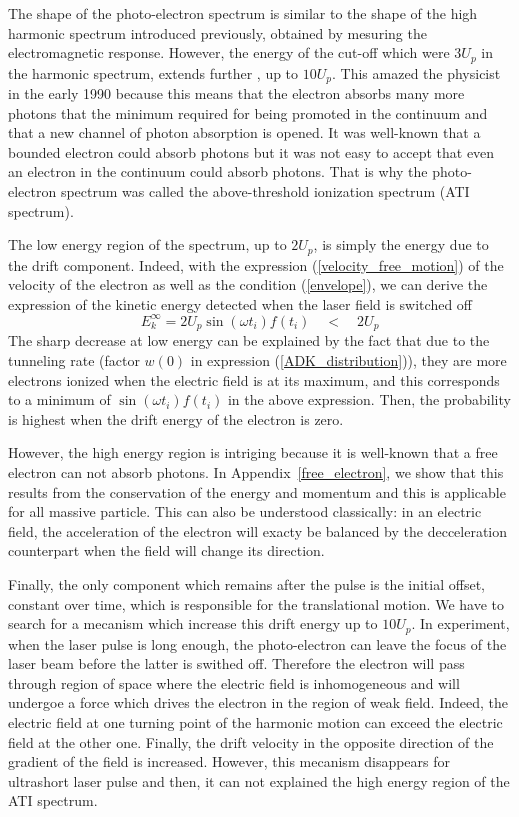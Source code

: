 \documentclass[a4paper]{article}
\begin{document}
\par
The shape of the photo-electron spectrum is similar to the shape of the high harmonic spectrum introduced previously, obtained by mesuring the electromagnetic response. However, the energy of the cut-off which were $3U_{p}$ in the harmonic spectrum, extends further \cite{Schafer_1993}, up to $10U_{p}$. This amazed the physicist in the early 1990 because this means that the electron absorbs many more photons that the minimum required for being promoted in the continuum and that a new channel of photon absorption is opened. It was well-known that a bounded electron could absorb photons but it was not easy to accept that even an electron in the continuum could absorb photons. That is why the photo-electron spectrum was called the above-threshold ionization spectrum (ATI spectrum).
\par
The low energy region of the spectrum, up to $2U_{p}$, is simply the energy due to the drift component. Indeed, with the expression (\ref{velocity_free_motion}) of the velocity of the electron as well as the condition (\ref{envelope}), we can derive the expression of the kinetic energy detected when the laser field is switched off
\begin{equation}
E_{k}^{\infty}=2U_{p}\sin(\omega t_{i})f(t_{i}) \quad < \quad 2U_{p}
\end{equation}
The sharp decrease at low energy can be explained by the fact that due to the tunneling rate (factor $w(0)$ in expression (\ref{ADK_distribution})), they are more electrons ionized when the electric field is at its maximum, and this corresponds to a minimum of $\sin(\omega t_{i})f(t_{i})$ in the above expression. Then, the probability is highest when the drift energy of the electron is zero.
\par
However, the high energy region is intriging because it is well-known that a free electron can not absorb photons. In Appendix~\ref{free_electron}, we show that this results from the conservation of the energy and momentum and this is applicable for all massive particle.
This can also be understood classically: in an electric field, the acceleration of the electron will exacty be balanced by the decceleration counterpart when the field will change its direction.
\par
Finally, the only component which remains after the pulse is the initial offset, constant over time, which is responsible for the translational motion. We have to search for a mecanism which increase this drift energy up to $10 U_{p}$.
In experiment, when the laser pulse is long enough, the photo-electron can leave the focus of the laser beam before the latter is swithed off. Therefore the electron will pass through region of space where the electric field is inhomogeneous and will undergoe a force which drives the electron in the region of weak field. Indeed, the electric field at one turning point of the harmonic motion can exceed the electric field at the other one. Finally, the drift velocity in the opposite direction of the gradient of the field is increased. However, this mecanism disappears for ultrashort laser pulse and then, it can not explained the high energy region of the ATI spectrum.
\end{document}
